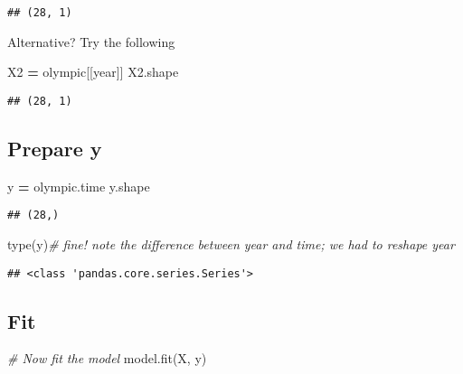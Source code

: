 \documentclass[
]{book}
\newenvironment{Shaded}{\begin{snugshade}}{\end{snugshade}}
\newcommand{\BuiltInTok}[1]{#1}
\newcommand{\CommentTok}[1]{\textcolor[rgb]{0.56,0.35,0.01}{\textit{#1}}}
\newcommand{\NormalTok}[1]{#1}
\newcommand{\OperatorTok}[1]{\textcolor[rgb]{0.81,0.36,0.00}{\textbf{#1}}}
\newcommand{\StringTok}[1]{\textcolor[rgb]{0.31,0.60,0.02}{#1}}
\begin{document}
\begin{verbatim}
## (28, 1)
\end{verbatim}

Alternative? Try the following

\begin{Shaded}
\begin{Highlighting}[]
\NormalTok{X2 }\OperatorTok{=}\NormalTok{ olympic[[}\StringTok{\textquotesingle{}year\textquotesingle{}}\NormalTok{]]}
\NormalTok{X2.shape}
\end{Highlighting}
\end{Shaded}

\begin{verbatim}
## (28, 1)
\end{verbatim}

\hypertarget{prepare-y}{%
\subsection{Prepare y}\label{prepare-y}}

\begin{Shaded}
\begin{Highlighting}[]
\NormalTok{y }\OperatorTok{=}\NormalTok{ olympic.time}
\NormalTok{y.shape}
\end{Highlighting}
\end{Shaded}

\begin{verbatim}
## (28,)
\end{verbatim}

\begin{Shaded}
\begin{Highlighting}[]
\BuiltInTok{type}\NormalTok{(y)}\CommentTok{\# fine! note the difference between year and time; we had to reshape year}
\end{Highlighting}
\end{Shaded}

\begin{verbatim}
## <class 'pandas.core.series.Series'>
\end{verbatim}

\hypertarget{fit}{%
\subsection{Fit}\label{fit}}

\begin{Shaded}
\begin{Highlighting}[]
\CommentTok{\# Now fit the model}
\NormalTok{model.fit(X, y)}
\end{Highlighting}
\end{Shaded}
\end{document}
